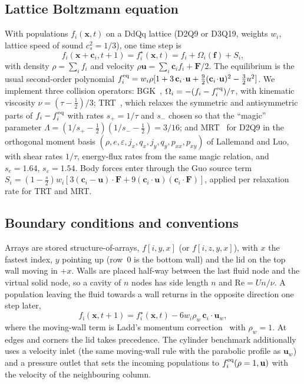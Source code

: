 \documentclass[11pt]{article}
\begin{document}
\subsection{Lattice Boltzmann equation}
With populations $f_i(\mathbf{x},t)$ on a DdQq lattice (D2Q9 or D3Q19, weights $w_i$, lattice
speed of sound $c_s^2=1/3$), one time step is
\begin{equation}
f_i(\mathbf{x}+\mathbf{c}_i, t+1) = f_i^\star(\mathbf{x},t)
= f_i + \Omega_i(\mathbf{f}) + S_i ,
\end{equation}
with density $\rho=\sum_i f_i$ and velocity $\rho\mathbf{u}=\sum_i\mathbf{c}_i f_i+\mathbf{F}/2$.
The equilibrium is the usual second-order polynomial
$f_i^{\rm eq}=w_i\rho[1+3\,\mathbf{c}_i\!\cdot\!\mathbf{u}+\tfrac92(\mathbf{c}_i\!\cdot\!\mathbf{u})^2-\tfrac32u^2]$.
We implement three collision operators:
BGK~\citep{bhatnagar1954,qian1992}, $\Omega_i=-(f_i-f_i^{\rm eq})/\tau$, with kinematic
viscosity $\nu=(\tau-\tfrac12)/3$;
TRT~\citep{ginzburg2008}, which relaxes the symmetric and antisymmetric parts of
$f_i-f_i^{\rm eq}$ with rates $s_+=1/\tau$ and $s_-$ chosen so that the ``magic'' parameter
$\Lambda=(1/s_+-\tfrac12)(1/s_--\tfrac12)=3/16$;
and MRT~\citep{lallemand2000,dhumieres2002} for D2Q9 in the orthogonal moment basis
$(\rho,e,\varepsilon,j_x,q_x,j_y,q_y,p_{xx},p_{xy})$ of Lallemand and Luo, with shear rates
$1/\tau$, energy-flux rates from the same magic relation, and $s_e=1.64$, $s_\varepsilon=1.54$.
Body forces enter through the Guo source term~\citep{guo2002}
$S_i=(1-\tfrac{s}{2})w_i[3(\mathbf{c}_i-\mathbf{u})\!\cdot\!\mathbf{F}+9(\mathbf{c}_i\!\cdot\!\mathbf{u})(\mathbf{c}_i\!\cdot\!\mathbf{F})]$,
applied per relaxation rate for TRT and MRT.

\subsection{Boundary conditions and conventions}
Arrays are stored structure-of-arrays, $f[i,y,x]$ (or $f[i,z,y,x]$), with $x$ the fastest index,
$y$ pointing up (row~0 is the bottom wall) and the lid on the top wall moving in $+x$. Walls
are placed half-way between the last fluid node and the virtual solid node, so a cavity of
$n$ nodes has side length $n$ and $\mathrm{Re}=U n/\nu$. A population leaving the fluid towards
a wall returns in the opposite direction one step later,
\begin{equation}
f_{\bar\imath}(\mathbf{x},t+1)=f_i^\star(\mathbf{x},t)-6w_i\rho_w\,\mathbf{c}_i\!\cdot\!\mathbf{u}_w ,
\end{equation}
where the moving-wall term is Ladd's momentum correction~\citep{ladd1994} with $\rho_w=1$. At
edges and corners the lid takes precedence. The cylinder benchmark additionally uses a
velocity inlet (the same moving-wall rule with the parabolic profile as $\mathbf{u}_w$) and a
pressure outlet that sets the incoming populations to $f_i^{\rm eq}(\rho=1,\mathbf{u})$ with
the velocity of the neighbouring column.
\end{document}
